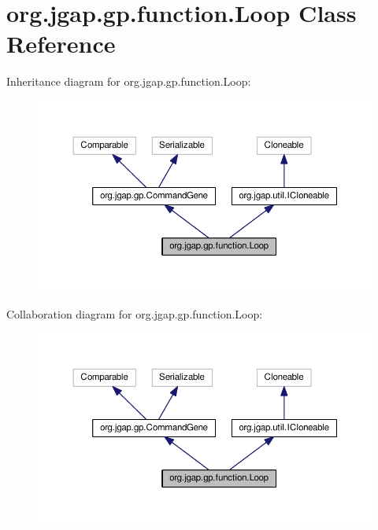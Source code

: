 \hypertarget{classorg_1_1jgap_1_1gp_1_1function_1_1_loop}{\section{org.\-jgap.\-gp.\-function.\-Loop Class Reference}
\label{classorg_1_1jgap_1_1gp_1_1function_1_1_loop}
}


Inheritance diagram for org.\-jgap.\-gp.\-function.\-Loop\-:
\nopagebreak
\begin{figure}[H]
\begin{center}
\leavevmode
\includegraphics[width=350pt]{classorg_1_1jgap_1_1gp_1_1function_1_1_loop__inherit__graph}
\end{center}
\end{figure}


Collaboration diagram for org.\-jgap.\-gp.\-function.\-Loop\-:
\nopagebreak
\begin{figure}[H]
\begin{center}
\leavevmode
\includegraphics[width=350pt]{classorg_1_1jgap_1_1gp_1_1function_1_1_loop__coll__graph}
\end{center}
\end{figure}
